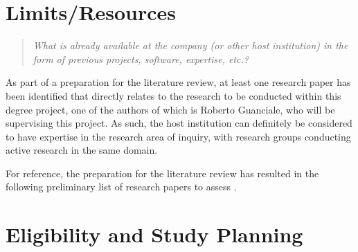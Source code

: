 \documentclass[12pt, a4paper]{article}
\begin{document}
\section{Limits/Resources}

\begin{quote}
	\textit{What is already available at the company (or other host institution) in the form of previous projects, software, expertise, etc.?}
\end{quote}

As part of a preparation for the literature review, at least one research paper \cite{sound_transpilation_from_binary_to_ir} has been identified that directly relates to the research to be conducted within this degree project, one of the authors of which is Roberto Guanciale, who will be supervising this project. As such, the host institution can definitely be considered to have expertise in the research area of inquiry, with research groups conducting active research in the same domain.

For reference, the preparation for the literature review has resulted in the following preliminary list of research papers to assess \cite{graph_based_ir,retargetable_binary_translator,dynamic_binary_translation,uqbt_binary_translator,retargetable_static_binary_translator,ssa_for_decompilation,valgrind,bitblaze,architecture_independent_binary_analysis_and_transformation,arm_analysis_using_llvm,bap,revgen,wartell_rewriting_x86_binaries,barf,singled_graph_disassembly,dbill,instruction_idiom_detection,graph_based_higher_order_ir,reconstruction_of_instruction_idioms,extracting_instruction_semantics_via_symbolic_exectuion_of_code_generators,software_transformation,state_of_the_art_of_war,function_recovery,bin2llvm,sound_transpilation_from_binary_to_ir,cast_study_llvm_suitable_for_binary_analysis,revng,evaluation_of_irs,binrec,lifter_synthesis,superset_disassembly,b2r2,llvm_ir_lifter_using_mcsema_and_dyninst,gtirb,case_for_bap_and_angr,retrowrite,refining_indirect_call_targets}.


\section{Eligibility and Study Planning}
\end{document}
